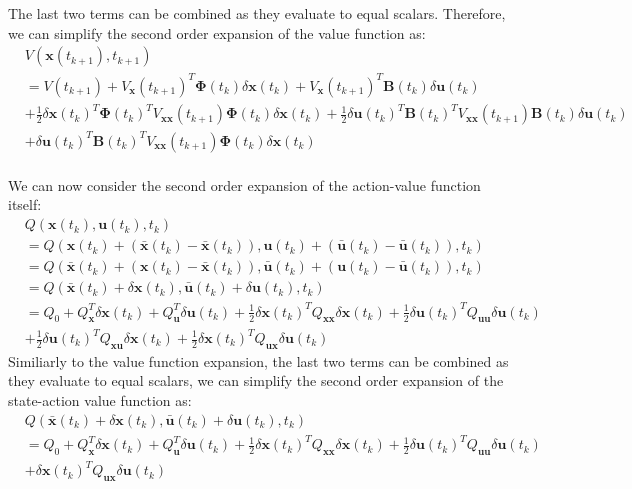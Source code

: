 \documentclass[11pt]{homework}
\renewcommand{\vec}[1]{\ensuremath{\boldsymbol{#1}}}
\begin{document}
\begin{arabicparts}
		The last two terms can be combined as they evaluate to equal scalars. Therefore, we can simplify the second order expansion of the value function as: 
			\begin{align*}
				& V(\vec{x}(t_{k+1}), t_{k+1}) \\
				& = V(t_{k+1}) + V_{\vec{x}}(t_{k+1})^{T}\vec{\Phi}(t_{k})\delta\vec{x}(t_{k}) +  V_{\vec{x}}(t_{k+1})^{T}\vec{B}(t_{k})\delta\vec{u}(t_{k}) \\
				& + \frac{1}{2}\delta\vec{x}(t_{k})^{T}\vec{\Phi}(t_{k})^{T}V_{\vec{xx}}(t_{k+1})\vec{\Phi}(t_{k})\delta\vec{x}(t_{k}) + \frac{1}{2}\delta\vec{u}(t_{k})^{T}\vec{B}(t_{k})^{T}V_{\vec{xx}}(t_{k+1})\vec{B}(t_{k})\delta\vec{u}(t_{k}) \\
				& + \delta\vec{u}(t_{k})^{T}\vec{B}(t_{k})^{T}V_{\vec{xx}}(t_{k+1})\vec{\Phi}(t_{k})\delta\vec{x}(t_{k}) \\
			\end{align*}
			
		We can now consider the second order expansion of the action-value function itself: 
			\begin{align*}
				& Q(\vec{x}(t_{k}), \vec{u}(t_{k}), t_{k}) \\
				& = Q(\vec{x}(t_{k}) + \left(\bar{\vec{x}}(t_{k}) - \bar{\vec{x}}(t_{k})\right), \vec{u}(t_{k}) + \left(\bar{\vec{u}}(t_{k}) - \bar{\vec{u}}(t_{k})\right), t_{k}) \\
				& = Q( \bar{\vec{x}}(t_{k}) + \left(\vec{x}(t_{k}) - \bar{\vec{x}}(t_{k})\right), \bar{\vec{u}}(t_{k}) + \left(\vec{u}(t_{k}) - \bar{\vec{u}}(t_{k})\right), t_{k}) \\
				& = Q(\bar{\vec{x}}(t_{k}) + \delta \vec{x}(t_{k}), \bar{\vec{u}}(t_{k}) + \delta \vec{u}(t_{k}), t_{k}) \\
				& = Q_{0} + Q_{\vec{x}}^T\delta{\vec{x}}(t_{k}) + Q_{\vec{u}}^T\delta{\vec{u}}(t_{k}) + \frac{1}{2}\delta\vec{x}(t_{k})^{T}Q_{\vec{xx}}\delta\vec{x}(t_{k})  + \frac{1}{2}\delta\vec{u}(t_{k})^{T}Q_{\vec{uu}}\delta\vec{u}(t_{k})\\
				&  + \frac{1}{2}\delta\vec{u}(t_{k})^{T}Q_{\vec{xu}}\delta\vec{x}(t_{k}) + \frac{1}{2}\delta\vec{x}(t_{k})^{T}Q_{\vec{ux}}\delta\vec{u}(t_{k})
			\end{align*}
		Similiarly to the value function expansion, the last two terms can be combined as they evaluate to equal scalars, we can simplify the second order expansion of the state-action value function as:
			\begin{align*}
				& Q(\bar{\vec{x}}(t_{k}) + \delta \vec{x}(t_{k}), \bar{\vec{u}}(t_{k}) + \delta \vec{u}(t_{k}), t_{k}) \\
				& = Q_{0} + Q_{\vec{x}}^T\delta{\vec{x}}(t_{k}) + Q_{\vec{u}}^T\delta{\vec{u}}(t_{k}) + \frac{1}{2}\delta\vec{x}(t_{k})^{T}Q_{\vec{xx}}\delta\vec{x}(t_{k})  + \frac{1}{2}\delta\vec{u}(t_{k})^{T}Q_{\vec{uu}}\delta\vec{u}(t_{k})\\
				& + \delta\vec{x}(t_{k})^{T}Q_{\vec{ux}}\delta\vec{u}(t_{k})
			\end{align*}
			

\end{arabicparts}
\end{document}

